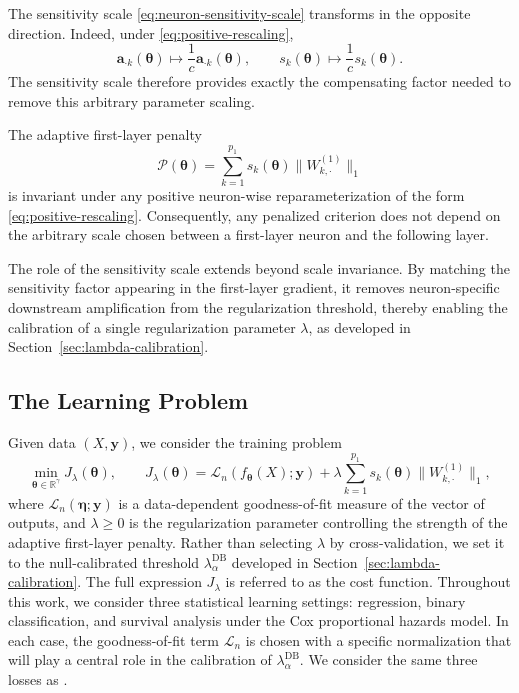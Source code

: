 \documentclass[twoside,11pt]{article}
\newcommand{\lamDB}{\lambda_\alpha^{\mathrm{DB}}}
\newcommand{\bth}{\boldsymbol{\theta}}
\newcommand{\bet}{\boldsymbol{\eta}}
\newcommand{\ba}{\mathbf{a}}
\newcommand{\by}{\mathbf{y}}
\newcommand{\PenWonek}{\|W^{(1)}_{k, \cdot}\|_1}
\newcommand{\R}{\mathbb{R}}
\begin{document}
The sensitivity scale \eqref{eq:neuron-sensitivity-scale} transforms in the opposite direction. Indeed, under \eqref{eq:positive-rescaling},
\begin{equation*}
    \ba_{\cdot k}(\bth)\mapsto \frac{1}{c}\ba_{\cdot k}(\bth),\qquad
    s_k(\bth)\mapsto\frac{1}{c}s_k(\bth).
\end{equation*}
The sensitivity scale therefore provides exactly the compensating factor needed to remove this arbitrary parameter scaling.

\begin{proposition}
\label{prop:penalty-scale-invariance}
The adaptive first-layer penalty
\begin{equation*}
    \mathcal P(\bth)=\sum_{k=1}^{p_1}s_k(\bth)\PenWonek
\end{equation*}
is invariant under any positive neuron-wise reparameterization of the form \eqref{eq:positive-rescaling}. Consequently, any penalized criterion does not depend on the arbitrary scale chosen between a first-layer neuron and the following layer.
\end{proposition}

The role of the sensitivity scale extends beyond scale invariance. By matching the sensitivity factor appearing in the first-layer gradient, it removes neuron-specific downstream amplification from the regularization threshold, thereby enabling the calibration of a single regularization parameter $\lambda$, as developed in Section~\ref{sec:lambda-calibration}.

\subsection{The Learning Problem}\label{sec:learning}
Given data $(X,\by)$, we consider the training problem
\begin{equation}\label{eq:optiprob}
    \min_{\bth \in \R^\gamma} J_\lambda(\bth),
    \qquad
    J_\lambda(\bth)=\mathcal{L}_n\left(f_{\bth}(X);\by\right)+
    \lambda\sum_{k=1}^{p_1}s_k(\bth)\PenWonek,
    \tag{P}
\end{equation}
where $\mathcal{L}_n(\bet;\by)$ is a data-dependent goodness-of-fit measure of the vector of outputs, and $\lambda\geq0$ is the regularization parameter controlling the strength of the adaptive first-layer penalty. Rather than selecting $\lambda$ by cross-validation, we set it to the null-calibrated threshold $\lamDB$ developed in Section~\ref{sec:lambda-calibration}. The full expression $J_\lambda$ is referred to as the cost function. Throughout this work, we consider three statistical learning settings: regression, binary classification, and survival analysis under the Cox proportional hazards model. In each case, the goodness-of-fit term $\mathcal{L}_n$ is chosen with a specific normalization that will play a central role in the calibration of $\lamDB$. We consider the same three losses as \citet{PIC-SMS2026}.
\end{document}
